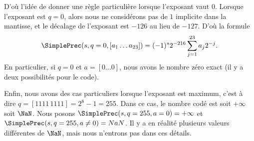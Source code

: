 D'où l'idée de donner une règle particulière lorsque l'exposant vaut \( 0\). Lorsque l'exposant est \( q=0\), alors nous ne considérons pas de \( 1\) implicite dans la mantisse, et le décalage de l'exposant est \( -126\) au lieu de \( -127\). D'où la formule
\begin{equation}
    \SimplePrec(s,q=0,[a_1\ldots a_{23}])=(-1)^s2^{-216}\sum_{j=1}^{23}a_j2^{-j}.
\end{equation}
En particulier, si \( q=0\) et \( a=[0\ldots 0]\), nous avons le nombre zéro exact (il y a deux possibilités pour le code).

Enfin, nous avons des cas particuliers lorsque l'exposant est maximum, c'est à dire \( q=[1111\,1111]=2^8-1=255\). Dans ce cas, le nombre codé est soit \( +\infty\) soit \( \NaN\). Nous posons \( \SimplePrec(s,q=255,a=0)=+\infty\) et \( \SimplePrec(s,q=255,a\neq 0)=NaN\). Il y a en réalité plusieurs valeurs différentes de \( \NaN\), mais nous n'entrons pas dans ces détails\cite{ooPOZNooQlGiUN}.

